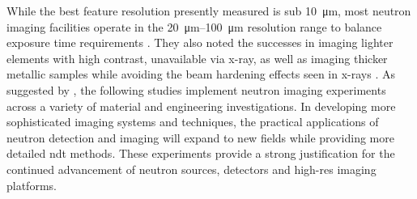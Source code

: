 \documentclass[../../../main.tex]{subfiles}%
\begin{document}
    While the best feature resolution presently measured is sub \SI{10}{\micro\meter}, most neutron imaging facilities operate in the \SIrange{20}{100}{\micro\meter} resolution range to balance exposure time requirements \cite{Trtik_2015}.
    They also noted the successes in imaging lighter elements with high contrast, unavailable via \gls{x-ray}, as well as imaging thicker metallic samples while avoiding the beam hardening effects seen in \glspl{x-ray} \cite{Lehmann_2017b}. 
    As suggested by \citeauthor*{Lehmann_2017b}, the following studies implement neutron imaging experiments across a variety of material and engineering investigations.
    In developing more sophisticated imaging systems and techniques, the practical applications of neutron detection and imaging will expand to new fields while providing more detailed \gls{ndt} methods. 
    These experiments provide a strong justification for the continued advancement of neutron sources, detectors and \gls{high-res} imaging platforms.
\end{document}
